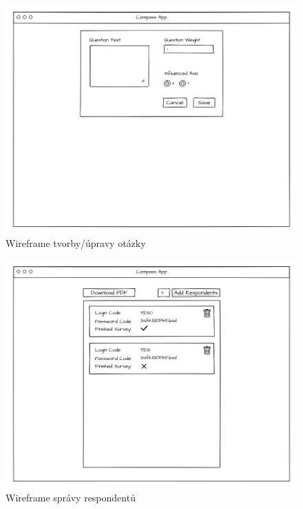 \begin{figure}[h!]
    \centering
    \includegraphics[width=\textwidth]{images/wireframes/Question_Edit.png}
    \caption{Wireframe tvorby/úpravy otázky}
\end{figure}

\begin{figure}[h!]
    \centering
    \includegraphics[width=\textwidth]{images/wireframes/Manage_Respondents.png}
    \caption{Wireframe správy respondentů}
\end{figure}

